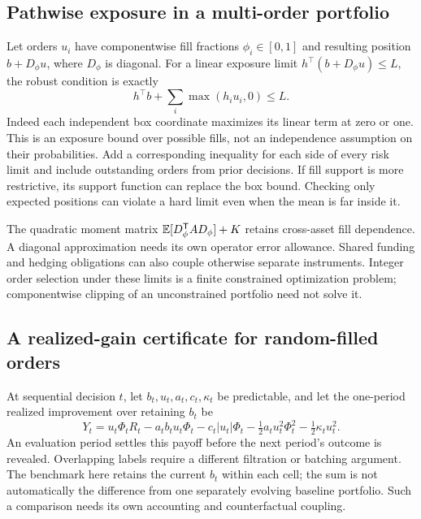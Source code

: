 \subsection{Pathwise exposure in a multi-order portfolio}\label{sec:fillbox}

Let orders $u_i$ have componentwise fill fractions $\phi_i\in[0,1]$ and
resulting position $b+D_\phi u$, where $D_\phi$ is diagonal. For a linear
exposure limit $h^\top(b+D_\phi u)\le L$, the robust condition is exactly
\begin{equation}\label{eq:fillboxexposure}
 h^\top b+\sum_i\max(h_i u_i,0)\le L.
\end{equation}
Indeed each independent box coordinate maximizes its linear term at zero
or one. This is an exposure bound over possible fills, not an independence
assumption on their probabilities. Add a corresponding inequality for
each side of every risk limit and include outstanding orders from prior
decisions. If fill support is more restrictive, its support function can
replace the box bound. Checking only expected positions can violate a hard
limit even when the mean is far inside it.

The quadratic moment matrix $\mathbb E[D_\phi^{\mathsf T}AD_\phi]+K$ retains
cross-asset fill dependence. A diagonal approximation needs its own operator
error allowance. Shared funding and hedging obligations can also couple
otherwise separate instruments. Integer order selection under these limits
is a finite constrained optimization problem; componentwise clipping of an
unconstrained portfolio need not solve it.

\subsection{A realized-gain certificate for random-filled orders}

At sequential decision $t$, let $b_t,u_t,a_t,c_t,\kappa_t$ be predictable,
and let the one-period realized improvement over retaining $b_t$ be
\begin{equation}\label{eq:filledY}
 Y_t=u_t\Phi_tR_t-a_tb_tu_t\Phi_t-c_t|u_t|\Phi_t
       -\tfrac12a_tu_t^2\Phi_t^2-\tfrac12\kappa_tu_t^2.
\end{equation}
An evaluation period settles this payoff before the next period's outcome
is revealed. Overlapping labels require a different filtration or batching
argument. The benchmark here retains the current $b_t$ within each cell;
the sum is not automatically the difference from one separately evolving
baseline portfolio. Such a comparison needs its own accounting and
counterfactual coupling.

